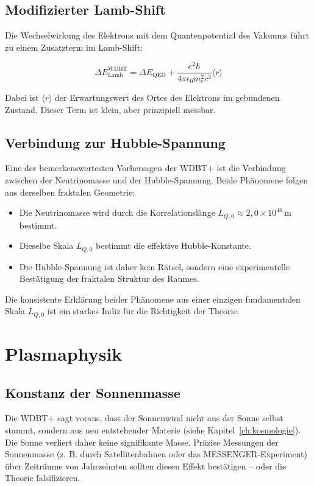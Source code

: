 \subsection{Modifizierter Lamb-Shift}
\label{sub:vorh_lamb_shift}

Die Wechselwirkung des Elektrons mit dem Quantenpotential des Vakuums führt zu einem Zusatzterm im Lamb-Shift:

\[
\Delta E_{\text{Lamb}}^{\text{WDBT}} = \Delta E_{\text{QED}} + \frac{e^2 \hbar}{4 \pi \epsilon_0 m_e^2 c^3} \langle r \rangle
\]

Dabei ist \( \langle r \rangle \) der Erwartungswert des Ortes des Elektrons im gebundenen Zustand. Dieser Term ist klein, aber prinzipiell messbar.

\subsection{Verbindung zur Hubble-Spannung}
\label{sub:vorh_neutrino_hubble}

Eine der bemerkenswertesten Vorhersagen der WDBT+ ist die Verbindung zwischen der Neutrinomasse und der Hubble-Spannung. Beide Phänomene folgen aus derselben fraktalen Geometrie:

\begin{itemize}
    \item Die Neutrinomasse wird durch die Korrelationslänge \( L_{Q,0} \approx 2{,}0 \times 10^{46} \, \text{m} \) bestimmt.
    \item Dieselbe Skala \( L_{Q,0} \) bestimmt die effektive Hubble-Konstante.
    \item Die Hubble-Spannung ist daher kein Rätsel, sondern eine experimentelle Bestätigung der fraktalen Struktur des Raumes.
\end{itemize}

Die konsistente Erklärung beider Phänomene aus einer einzigen fundamentalen Skala \( L_{Q,0} \) ist ein starkes Indiz für die Richtigkeit der Theorie.

\section{Plasmaphysik}
\label{sec:vorh_plasma}

\subsection{Konstanz der Sonnenmasse}
\label{sub:vorh_sonnenmasse}

Die WDBT+ sagt voraus, dass der Sonnenwind nicht aus der Sonne selbst stammt, sondern aus neu entstehender Materie (siehe Kapitel~\ref{ch:kosmologie}). Die Sonne verliert daher keine signifikante Masse. Präzise Messungen der Sonnenmasse (z. B. durch Satellitenbahnen oder das MESSENGER-Experiment) über Zeiträume von Jahrzehnten sollten diesen Effekt bestätigen – oder die Theorie falsifizieren.

